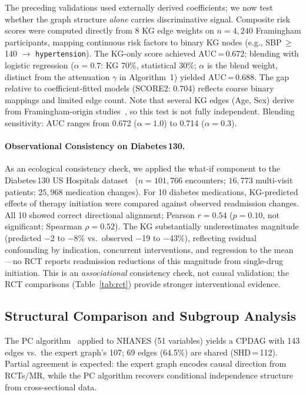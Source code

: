 \documentclass[runningheads]{llncs}
\begin{document}
The preceding validations used externally derived coefficients;
we now test whether the graph structure \emph{alone} carries
discriminative signal.
Composite risk scores were computed directly from 8 KG edge weights
on $n = 4{,}240$ Framingham participants, mapping continuous risk
factors to binary KG nodes
(e.g., SBP\,$\geq$\,140 $\to$ \texttt{hypertension}).
The KG-only score achieved AUC\,=\,0.672; blending with logistic
regression ($\alpha\!=\!0.7$: KG 70\%, statistical 30\%;
$\alpha$ is the blend weight, distinct from the attenuation
$\gamma$ in Algorithm~1) yielded AUC\,=\,0.688.
The gap relative to coefficient-fitted models (SCORE2: 0.704)
reflects coarse binary mappings and limited edge count.
Note that several KG edges (Age, Sex) derive from
Framingham-origin studies~\cite{dagostino2008}, so this test is
not fully independent.
Blending sensitivity: AUC ranges from 0.672 ($\alpha\!=\!1.0$)
to 0.714 ($\alpha\!=\!0.3$).

\paragraph{Observational Consistency on Diabetes\,130.}\label{sec:diab130}
As an ecological consistency check, we applied the what-if
component to the Diabetes\,130 US Hospitals
dataset~\cite{strack2014diabetes130}
($n\!=\!101{,}766$ encounters; $16{,}773$ multi-visit patients;
$25{,}968$ medication changes).
For 10 diabetes medications, KG-predicted effects of therapy
initiation were compared against observed readmission changes.
All 10 showed correct directional alignment; Pearson
$r = 0.54$ ($p = 0.10$, not significant; Spearman $\rho = 0.52$).
The KG substantially underestimates magnitude (predicted $-$2 to
$-$8\% vs.\ observed $-$19 to $-$43\%), reflecting residual
confounding by indication, concurrent interventions, and regression
to the mean---no RCT reports readmission reductions of this
magnitude from single-drug initiation.
This is an \emph{associational} consistency check, not causal
validation; the RCT comparisons (Table~\ref{tab:rct}) provide
stronger interventional evidence.

\subsection{Structural Comparison and Subgroup Analysis}\label{sec:pcalg}

The PC algorithm~\cite{spirtes2000causation} applied to NHANES
(51 variables) yields a CPDAG with 143 edges vs.\ the expert graph's
107; 69 edges (64.5\%) are shared (SHD\,=\,112).
Partial agreement is expected: the expert graph encodes causal
direction from RCTs/MR, while the PC algorithm recovers conditional
independence structure from cross-sectional data.
\end{document}
